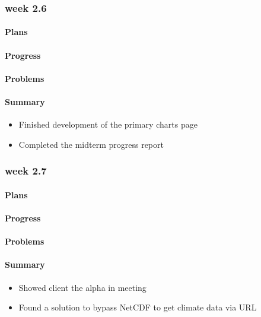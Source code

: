 \documentclass[onecolumn, draftclsnofoot,10pt, compsoc]{article}
\begin{document}
		\subsubsection{week 2.6}
			\paragraph{Plans} \hfill \break

			\paragraph{Progress} \hfill \break

			\paragraph{Problems} \hfill \break

			\paragraph{Summary} \hfill \break
				\begin{itemize}
                    \item Finished development of the primary charts page
                    \item Completed the midterm progress report 
                \end{itemize}
			
		\subsubsection{week 2.7}
			\paragraph{Plans} \hfill \break
		    \paragraph{Progress} \hfill \break
			\paragraph{Problems} \hfill \break
			\paragraph{Summary} \hfill \break
				\begin{itemize}
                    \item Showed client the alpha in meeting 
                    \item Found a solution to bypass NetCDF to get climate data via URL 
                \end{itemize}
\end{document}
